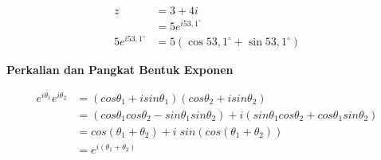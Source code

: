 \documentclass{article}
\begin{document}
    \begin{align}
    z                   &= 3 + 4i
                        \nonumber\\
                        &= 5e^{i 53,1^{\circ}}
                        \nonumber\\
    5e^{i 53,1^{\circ}} &= 5(\cos 53,1^{\circ} + \sin 53,1^{\circ})
                        \nonumber
    \end{align}

    \newpage
    \begin{center}
        \textbf{Perkalian dan Pangkat Bentuk Exponen}
    \end{center}
    \begin{align}
        e^{i\theta_1} e^{i\theta_2} &= (cos\theta_1 + i sin\theta_1)(cos\theta_2 + i sin\theta_2)
                                    \nonumber\\
                                    &=(cos\theta_1 cos\theta_2 - sin\theta_1 sin\theta_2) + i(sin\theta_1cos\theta_2 + cos\theta_1 sin\theta_2)
                                    \nonumber\\
                                    &= cos(\theta_1 + \theta_2) + i\;sin(cos(\theta_1 + \theta_2))
                                    \nonumber\\
                                    &= e^{i(\theta_1 + \theta_2)}
    \end{align}
    
\end{document}
